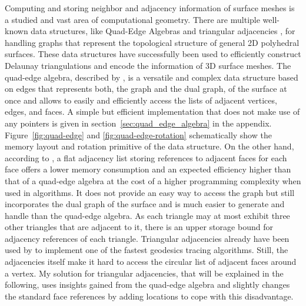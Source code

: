 \documentclass{stdlocal}
\begin{document}
  Computing and storing neighbor and adjacency information of surface meshes is a studied and vast area of computational geometry.
  There are multiple well-known data structures, like Quad-Edge Algebras \autocite{guibas1985} and triangular adjacencies \autocite{shewchuk1996}, for handling graphs that represent the topological structure of general 2D polyhedral surfaces.
  These data structures have successfully been used to efficiently construct Delaunay triangulations and encode the information of 3D surface meshes.
  The quad-edge algebra, described by \textcite{guibas1985}, is a versatile and complex data structure based on edges that represents both, the graph and the dual graph, of the surface at once and allows to easily and efficiently access the lists of adjacent vertices, edges, and faces.
  A simple but efficient implementation that does not make use of any pointers is given in section~\ref{sec:quad_edge_algebra} in the appendix.
  Figure~\ref{fig:quad-edge} and \ref{fig:quad-edge-rotation} schematically show the memory layout and rotation primitive of the data structure.
  On the other hand, according to \textcite{shewchuk1996}, a flat adjacency list storing references to adjacent faces for each face offers a lower memory consumption and an expected efficiency higher than that of a quad-edge algebra at the cost of a higher programming complexity when used in algorithms.
  It does not provide an easy way to access the graph but still incorporates the dual graph of the surface and is much easier to generate and handle than the quad-edge algebra.
  As each triangle may at most exhibit three other triangles that are adjacent to it, there is an upper storage bound for adjacency references of each triangle.
  Triangular adjacencies already have been used by \textcite{mancinelli2022} to implement one of the fastest geodesics tracing algorithms.
  Still, the adjacencies itself make it hard to access the circular list of adjacent faces around a vertex.
  My solution for triangular adjacencies, that will be explained in the following, uses insights gained from the quad-edge algebra and slightly changes the standard face references by adding locations to cope with this disadvantage.
\end{document}
